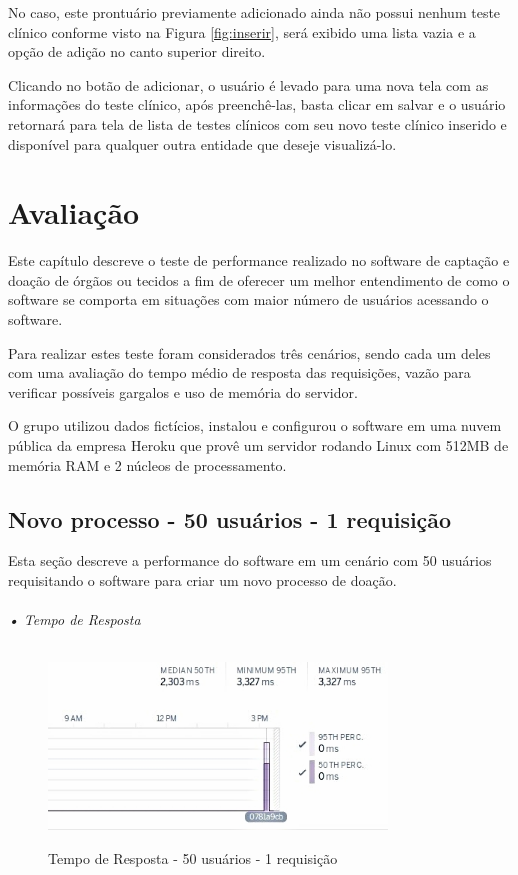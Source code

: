 \documentclass[portuguese,oneside]{tcc}
\begin{document}
No caso, este prontuário previamente adicionado ainda não possui nenhum teste clínico conforme visto na Figura \ref{fig:inserir}, será exibido uma lista vazia e a opção de adição no canto superior direito. 

Clicando no botão de adicionar, o usuário é levado para uma nova tela com as informações do teste clínico, após preenchê-las, basta clicar em salvar e o usuário retornará para tela de lista de testes clínicos com seu novo teste clínico inserido e disponível para qualquer outra entidade que deseje visualizá-lo.


\chapter{Avaliação}
Este capítulo descreve o teste de performance realizado no software de captação e doação de órgãos ou tecidos a fim de oferecer um melhor entendimento de como o software se comporta em situações com maior número de usuários acessando o software.

Para realizar estes teste foram considerados três cenários, sendo cada um deles com uma avaliação do tempo médio de resposta das requisições, vazão para verificar possíveis gargalos e uso de memória do servidor.

O grupo utilizou dados fictícios, instalou e configurou o software em uma nuvem pública da empresa Heroku que provê um servidor rodando Linux com 512MB de memória RAM e 2 núcleos de processamento.  

\section{Novo processo - 50 usuários - 1 requisição}
Esta seção descreve a performance do software em um cenário com 50 usuários requisitando o software para criar um novo processo de doação.

\subparagraph{• Tempo de Resposta}
\begin{figure}[htp]
\centering
\caption{Tempo de Resposta - 50 usuários - 1 requisição}
\includegraphics[width=9cm]{50-1-response-time}
\label{fig:tempo-reposta-50-1}
\end{figure}
\end{document}
